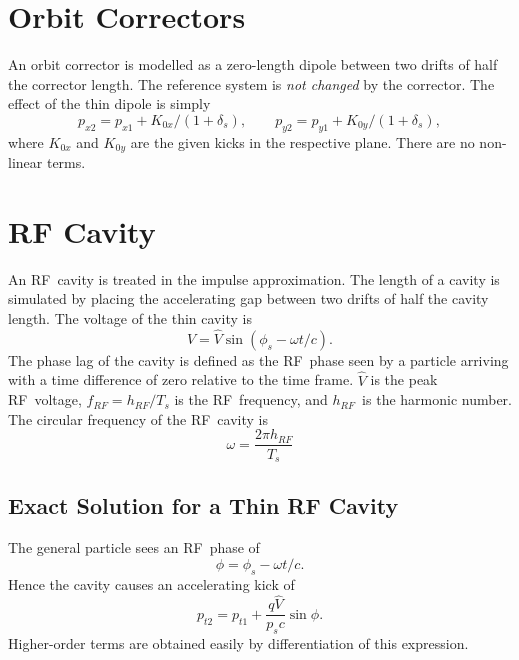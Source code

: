  
\section{Orbit Correctors}
\label{corrector}
An orbit corrector is modelled as a zero-length dipole between two
drifts of half the corrector length.
The reference system is {\em not changed} by the corrector.
The effect of the thin dipole is simply
\begin{equation}
p_{x2} = p_{x1} + K_{0x} / (1 + \delta_s), \qquad
p_{y2} = p_{y1} + K_{0y} / (1 + \delta_s),
\end{equation}
where $K_{0x}$ and $K_{0y}$ are the given kicks in the respective plane.
There are no non-linear terms.
 
 
\section{RF Cavity}
\label{cavity}
An RF~cavity is treated in the impulse approximation.
The length of a cavity is simulated by placing the accelerating gap
between two drifts of half the cavity length.
The voltage of the thin cavity is
\begin{equation}
V = \hat{V} \sin(\phi_s - \omega t/c).
\end{equation}
The phase lag of the cavity is defined as the RF~phase seen by a
particle arriving with a time difference of zero relative to the
time frame.
$\hat{V}$ is the peak RF~voltage,
$f_{RF} = h_{RF} / T_s$ is the RF~frequency,
and $h_{RF}$~is the harmonic number.
The circular frequency of the RF~cavity is
\begin{equation}
\omega = \frac{2 \pi h_{RF}}{T_s}
\end{equation}
 
\subsection{Exact Solution for a Thin RF Cavity}
The general particle sees an RF~phase of
\begin{equation}
\phi = \phi_s - \omega t / c.
\end{equation}
Hence the cavity causes an accelerating kick of
\begin{equation}
p_{t2} = p_{t1} + \frac{q \hat{V}}{p_s c}\sin\phi.
\end{equation}
Higher-order terms are obtained easily by differentiation of this
expression.
 
